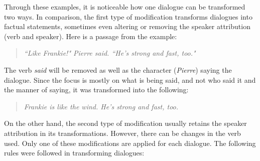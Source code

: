Through these examples, it is noticeable how one dialogue can be transformed two ways. In comparison, the first type of modification transforms dialogues into factual statements, sometimes even altering or removing the speaker attribution (verb and speaker). Here is a passage from the example:

\begin{verse}
\itshape
``Like Frankie!" Pierre said. ``He's strong and fast, too." \\
\end{verse}

The verb \textit{said} will be removed as well as the character (\textit{Pierre}) saying the dialogue. Since the focus is mostly on what is being said, and not who said it and the manner of saying, it was transformed into the following:

\begin{verse}
\itshape
Frankie is like the wind. He's strong and fast, too. \\
\end{verse}

On the other hand, the second type of modification usually retains the speaker attribution in its transformations. However, there can be changes in the verb used. Only one of these modifications are applied for each dialogue. The following rules were followed in transforming dialogues:

